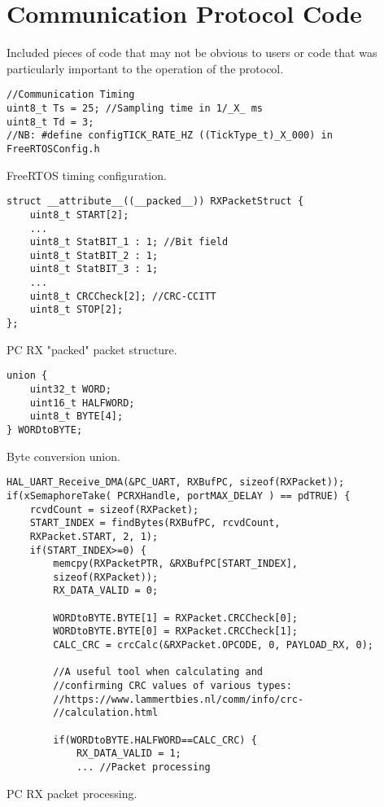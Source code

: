 \chapter{Communication Protocol Code}
\label{app:Communication Protocol Code}
Included pieces of code that may not be obvious to users or code that was particularly important to the operation of the protocol.


\begin{listing}[ht]
\begin{verbatim}
//Communication Timing
uint8_t Ts = 25; //Sampling time in 1/_X_ ms
uint8_t Td = 3;
//NB: #define configTICK_RATE_HZ ((TickType_t)_X_000) in FreeRTOSConfig.h
\end{verbatim}
\caption{FreeRTOS timing configuration.}
\label{listing:FreeRTOS timing}
\end{listing}

\begin{listing}[ht]
\begin{verbatim}
struct __attribute__((__packed__)) RXPacketStruct {
	uint8_t START[2];
	...
	uint8_t StatBIT_1 : 1; //Bit field
	uint8_t StatBIT_2 : 1;
	uint8_t StatBIT_3 : 1;
	...
	uint8_t CRCCheck[2]; //CRC-CCITT        
	uint8_t STOP[2];
};
\end{verbatim}
\caption{PC RX "packed" packet structure.}
\label{listing:packed-packet}
\end{listing}

\begin{listing}[ht]
\begin{verbatim}
union {
	uint32_t WORD;
	uint16_t HALFWORD;
	uint8_t BYTE[4];
} WORDtoBYTE;
\end{verbatim}
\caption{Byte conversion union.}
\label{listing:Byte conversion union}
\end{listing}

\begin{listing}[ht]
\begin{verbatim}
HAL_UART_Receive_DMA(&PC_UART, RXBufPC, sizeof(RXPacket));
if(xSemaphoreTake( PCRXHandle, portMAX_DELAY ) == pdTRUE) {
	rcvdCount = sizeof(RXPacket);
	START_INDEX = findBytes(RXBufPC, rcvdCount, 
	RXPacket.START, 2, 1);
	if(START_INDEX>=0) {
		memcpy(RXPacketPTR, &RXBufPC[START_INDEX], 		
		sizeof(RXPacket));
		RX_DATA_VALID = 0;

		WORDtoBYTE.BYTE[1] = RXPacket.CRCCheck[0];
		WORDtoBYTE.BYTE[0] = RXPacket.CRCCheck[1];
		CALC_CRC = crcCalc(&RXPacket.OPCODE, 0, PAYLOAD_RX, 0);
		
		//A useful tool when calculating and 
		//confirming CRC values of various types: 
		//https://www.lammertbies.nl/comm/info/crc-		
		//calculation.html

		if(WORDtoBYTE.HALFWORD==CALC_CRC) {
			RX_DATA_VALID = 1;
			... //Packet processing
\end{verbatim}
\caption{PC RX packet processing.}
\label{listing:PC RX packet processing}
\end{listing}

